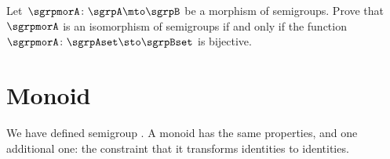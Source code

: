 \begin{gradedexercise}\label{ex:CharacterizeSemigroupIsos}
  \label{ex:semi-morph}
  Let~$\sgrpmorA\colon \sgrpA \mto \sgrpB$ be a morphism of semigroups.
  Prove that~$\sgrpmorA$ is an isomorphism of semigroups if and only if the function~$\sgrpmorA \colon \sgrpAset \sto \sgrpBset$ is bijective.
\end{gradedexercise}


\section{Monoid \whomos}

We have defined semigroup \whomo. A monoid \whomo has the same properties, and one additional one: the constraint that it transforms identities to identities.

